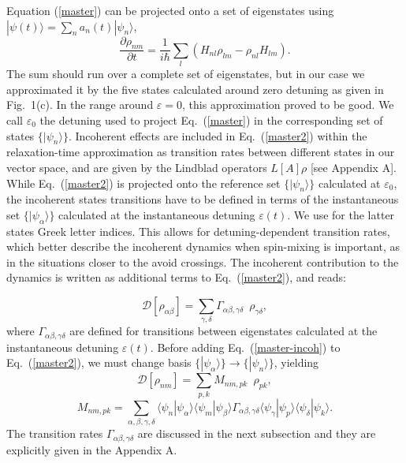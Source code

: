 \documentclass[prb,twocolumn,showpacs,floats]{revtex4}
\begin{document}
Equation (\ref{master}) can be projected onto a set of eigenstates using 
$| \psi (t) \rangle = \sum_n a_n (t) | \psi_n \rangle$,
\begin{equation}
\frac{ \partial \rho_{nm}}{\partial t} = \frac{1}{i \hbar} \sum_l ( H_{nl} \rho_{lm} - \rho_{nl} H_{lm} ).
\label{master2}
\end{equation}
The sum should run over a complete set of eigenstates, but in our case we approximated it by the 
five states calculated around zero detuning as given in Fig.~1(c). In the range 
around $\varepsilon = 0$, this approximation proved to be good.\cite{comment-triplet20}
We call $\varepsilon_0$ the detuning used to project Eq.~(\ref{master}) in
 the corresponding set of states $\{ | \psi_n \rangle \}$.
Incoherent effects are included in Eq.~(\ref{master2}) within the relaxation-time approximation as
transition rates between different states in our vector space, and are given by the Lindblad operators 
$L[A] \rho$ [see Appendix A]. 
While Eq.~(\ref{master2}) is projected onto the reference set $\{ | \psi_n \rangle \}$ 
calculated at $\varepsilon_0$, the incoherent states transitions have to be defined in terms of the instantaneous
 set $\{ | \psi_\alpha \rangle \}$ calculated at the instantaneous detuning $\varepsilon (t)$.
We use for the latter states Greek letter indices.
This allows for detuning-dependent transition rates, which better describe the incoherent dynamics when 
spin-mixing is important, as in the situations closer to the avoid crossings. 
 The incoherent contribution to the dynamics is written as additional terms
to Eq.~(\ref{master2}), and reads:

\begin{equation}
\mathcal{D} \left[\rho_{\alpha\beta}\right]=
\sum_{\gamma,\delta}  \Gamma_{\alpha\beta,\gamma\delta} \enspace \rho_{\gamma\delta},
\label{master-incoh}
\end{equation}
where $\Gamma_{\alpha\beta,\gamma\delta}$ are defined for transitions between 
eigenstates calculated at the instantaneous detuning $\varepsilon (t)$.
Before adding Eq.~(\ref{master-incoh}) to Eq.~(\ref{master2}), we must change basis
$\{ | \psi_\alpha \rangle \} \rightarrow \{ | \psi_n \rangle \}$, yielding
\begin{equation}
\mathcal{D} \left[\rho_{nm}\right]=
\sum_{p,k}  M_{nm,pk} \enspace \rho_{pk},
\label{master-incoh2}
\end{equation}
\begin{equation}
M_{nm,pk}=\sum_{\alpha,\beta,\gamma,\delta} 
\langle \psi_n | \psi_\alpha \rangle     \langle \psi_m| \psi_\beta \rangle 
  \Gamma_{\alpha\beta,\gamma\delta} 
  \langle \psi_\gamma | \psi_p \rangle     \langle \psi_\delta| \psi_k \rangle .
\label{m-incoh}
\end{equation}
The transition rates $\Gamma_{\alpha\beta,\gamma\delta}$ are discussed in the next
subsection and they are explicitly given in the Appendix A.
\end{document}
